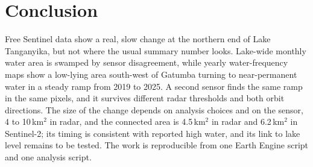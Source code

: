 \documentclass[conference]{IEEEtran}
\begin{document}
\section{Conclusion}

Free Sentinel data show a real, slow change at the northern end of Lake Tanganyika, but not where the usual summary number looks. Lake-wide monthly water area is swamped by sensor disagreement, while yearly water-frequency maps show a low-lying area south-west of Gatumba turning to near-permanent water in a steady ramp from 2019 to 2025. A second sensor finds the same ramp in the same pixels, and it survives different radar thresholds and both orbit directions. The size of the change depends on analysis choices and on the sensor, 4 to 10\,km$^2$ in radar, and the connected area is 4.5\,km$^2$ in radar and 6.2\,km$^2$ in Sentinel-2; its timing is consistent with reported high water, and its link to lake level remains to be tested. The work is reproducible from one Earth Engine script and one analysis script.



\end{document}
